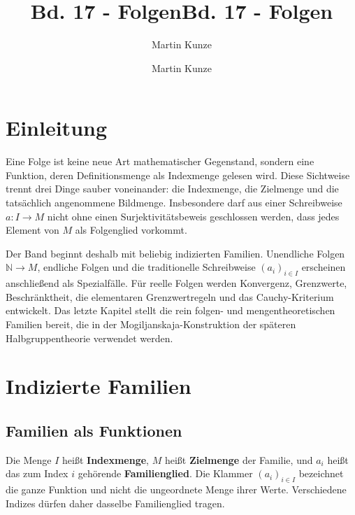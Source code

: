 \documentclass[main.tex]{subfiles}
\title{Bd. 17 - Folgen}
\author{Martin Kunze}
\date{}
\begin{document}
\title{Bd. 17 - Folgen}
\author{Martin Kunze}
\date{}
\hypersetup{pageanchor=false}
\maketitle
\hypersetup{pageanchor=true}
\setcounter{tocdepth}{3}
\tableofcontents
\setcounter{file}{17}
\renewcommand{\FormulaBandID}{17}

\chapter{Einleitung}

Eine Folge ist keine neue Art mathematischer Gegenstand, sondern eine
Funktion, deren Definitionsmenge als Indexmenge gelesen wird. Diese Sichtweise
trennt drei Dinge sauber voneinander: die Indexmenge, die Zielmenge und die
tatsächlich angenommene Bildmenge. Insbesondere darf aus einer Schreibweise
\(a\colon I\to M\) nicht ohne einen Surjektivitätsbeweis geschlossen werden,
dass jedes Element von \(M\) als Folgenglied vorkommt.

Der Band beginnt deshalb mit beliebig indizierten Familien. Unendliche Folgen
\(\mathbb N\to M\), endliche Folgen und die traditionelle Schreibweise
\((a_i)_{i\in I}\) erscheinen anschließend als Spezialfälle. Für reelle
Folgen werden Konvergenz, Grenzwerte, Beschränktheit, die elementaren
Grenzwertregeln und das Cauchy-Kriterium entwickelt. Das letzte Kapitel stellt
die rein folgen- und mengentheoretischen Familien bereit, die in der
Mogiljanskaja-Konstruktion der späteren Halbgruppentheorie verwendet werden.

\chapter{Indizierte Familien}

\section{Familien als Funktionen}


Die Menge \(I\) heißt \textbf{Indexmenge}, \(M\) heißt \textbf{Zielmenge}
der Familie, und \(a_i\) heißt das zum Index \(i\) gehörende
\textbf{Familienglied}. Die Klammer \((a_i)_{i\in I}\) bezeichnet die ganze
Funktion und nicht die ungeordnete Menge ihrer Werte. Verschiedene Indizes
dürfen daher dasselbe Familienglied tragen.
\end{document}
